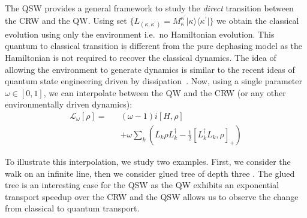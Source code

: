 \documentclass[11pt,oneside,final]{huthesis}%
\begin{document}

The QSW provides a general framework to study the \emph{direct} transition between the CRW and the QW. Using set $\{L_{(\kappa,\kappa^\prime)}=M_\kappa^{\kappa^\prime}\vert \kappa \rangle\langle \kappa^\prime\vert\}$ we obtain the classical evolution using only the environment i.e.~no Hamiltonian evolution. This quantum to classical transition is different from the pure dephasing model as the Hamiltonian is not required to recover the classical dynamics.  The idea of allowing the environment to generate dynamics is similar to the recent ideas of quantum state engineering driven by dissipation~\cite{Verstraete09,Kraus08,Diehl08}. Now, using a single parameter $\omega\in [0,1]$, we can interpolate between the QW and the CRW (or any other environmentally driven dynamics):
\begin{eqnarray}
\mathcal{L}_\omega \left[ \rho\right]=& &(\omega-1)i\left[ H,\rho \right]\nonumber\\
& &+\omega\sum_k\left(L_k \rho
  L_k^\dagger- \frac{1}{2}[L_k^\dagger
  L_k,\rho]_+ \right)
  \label{eq:interp}
  \end{eqnarray}

To illustrate this interpolation, we study two examples.  First, we consider the walk on an infinite line, then we consider glued tree of depth three \cite{Childs02,Childs03}.  The glued tree is an interesting case for the QSW as the QW exhibits an exponential transport speedup over the CRW and the QSW allows us to observe the change from classical to quantum transport. 
\end{document}

